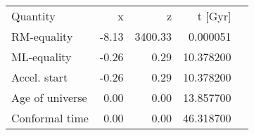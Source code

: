 \begin{tabular}{lrrrl}
Quantity & x & z & t [Gyr] &  \\
RM-equality  & -8.13 & 3400.33 & 0.000051 &   \\
ML-equality  & -0.26 & 0.29 & 10.378200 &   \\
Accel. start  & -0.26 & 0.29 & 10.378200 &    \\
Age of universe  & 0.00 & 0.00 & 13.857700 &   \\
Conformal time  & 0.00 & 0.00 & 46.318700 &   \\
\end{tabular}
